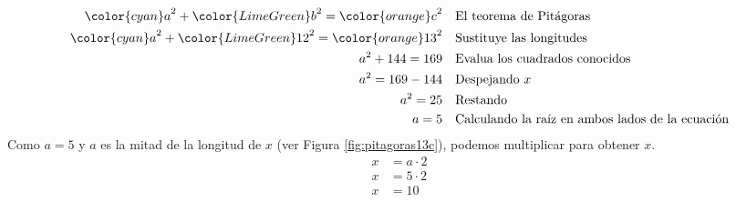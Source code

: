 \begin{solutionbox}{16cm}
\begin{minipage}{0.75\textwidth}
\begin{align*}
            {\color{cyan}a}^2+{\color{LimeGreen}b}^2  ={\color{orange}c}^2   & \text{\quad El teorema de Pitágoras}                          \\
            {\color{cyan}a}^2+{\color{LimeGreen}12}^2  ={\color{orange}13}^2 & \text{\quad Sustituye las longitudes}                         \\
            a^2+144   =169                                                   & \text{\quad Evalua los cuadrados conocidos}                   \\
            a^2=169-144                                                      & \text{\quad Despejando } x                                    \\
            a^2=25                                                           & \text{\quad Restando}                                         \\
            a=5                                                              & \text{\quad Calculando la raíz en ambos lados de la ecuación} \\
        \end{align*}
        Como $a=5$ y $a$ es la mitad de la longitud de $x$ (ver Figura \ref{fig:pitagoras13c}), podemos multiplicar para obtener $x$.
        \begin{align*}
            x & = a\cdot 2 \\
            x & = 5\cdot 2 \\
            x & = 10       \\
        \end{align*}
    \end{minipage}
\end{solutionbox}
